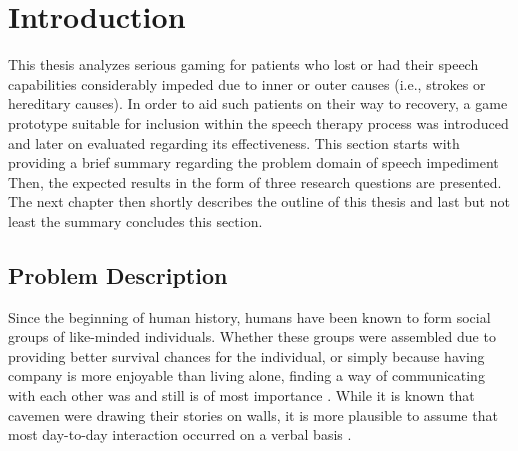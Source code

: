 \documentclass[draft,final]{vutinfth} %
\begin{document}

\tableofcontents %

\mainmatter

\chapter{Introduction}
\label{chap:intro}
This thesis analyzes serious gaming for patients who lost or had their speech capabilities considerably impeded due to inner or outer causes (i.e., strokes or hereditary causes). In order to aid such patients on their way to recovery, a game prototype suitable for inclusion within the speech therapy process was introduced and later on evaluated regarding its effectiveness. This section starts with providing a brief summary regarding the problem domain of speech impediment Then, the expected results in the form of three research questions are presented. The next chapter then shortly describes the outline of this thesis and last but not least the summary concludes this section.
\section{Problem Description}
Since the beginning of human history, humans have been known to form social groups of like-minded individuals. Whether these groups were assembled due to providing better survival chances for the individual, or simply because having company is more enjoyable than living alone, finding a way of communicating with each other was and still is of most importance \cite{kelly2015knowledge}. While it is known that cavemen were drawing their stories on walls, it is more plausible to assume that most day-to-day interaction occurred on a verbal basis \cite{singleton2011communication}. 
\end{document}
